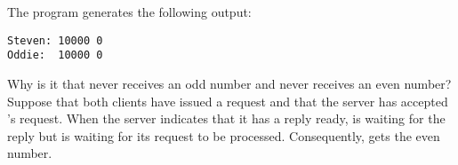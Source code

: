 The program generates the following output:
\begin{verbatim}
Steven: 10000 0
Oddie:  10000 0
\end{verbatim}

Why is it that  never receives an odd number and  never receives an even number?  Suppose that both clients have issued a request and that the server has accepted 's request.  When the server indicates that it has a reply ready,  is waiting for the reply but  is waiting for its request to be processed.  Consequently,  gets the even number.